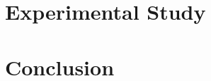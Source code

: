 \documentclass[procedia]{easychair}
\begin{document}
	\section{Experimental Study}
	\label{sect:experimental-study}
	
	\section{Conclusion}
	\label{sect:conclusion}
	
	\label{sect:bib}
	
	
\end{document}
